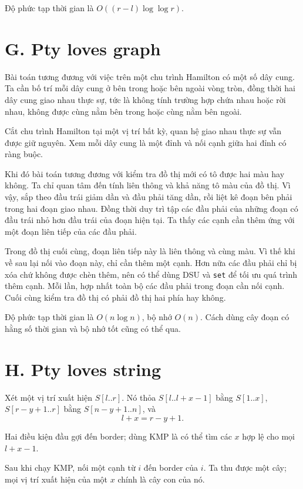 \documentclass[11pt]{article}
\begin{document}
Độ phức tạp thời gian là $O((r-l)\log\log r)$.

\section{G. Pty loves graph}

Bài toán tương đương với việc trên một chu trình Hamilton có một số dây
cung. Ta cần bố trí mỗi dây cung ở bên trong hoặc bên ngoài vòng tròn, đồng
thời hai dây cung giao nhau thực sự, tức là không tính trường hợp chứa nhau
hoặc rời nhau, không được cùng nằm bên trong hoặc cùng nằm bên ngoài.

Cắt chu trình Hamilton tại một vị trí bất kỳ, quan hệ giao nhau thực sự vẫn
được giữ nguyên. Xem mỗi dây cung là một đỉnh và nối cạnh giữa hai đỉnh có
ràng buộc.

Khi đó bài toán tương đương với kiểm tra đồ thị mới có tô được hai màu hay
không. Ta chỉ quan tâm đến tính liên thông và khả năng tô màu của đồ thị.
Vì vậy, sắp theo đầu trái giảm dần và đầu phải tăng dần, rồi liệt kê đoạn
bên phải trong hai đoạn giao nhau. Đồng thời duy trì tập các đầu phải của
những đoạn có đầu trái nhỏ hơn đầu trái của đoạn hiện tại. Ta thấy các cạnh
cần thêm ứng với một đoạn liên tiếp của các đầu phải.

Trong đồ thị cuối cùng, đoạn liên tiếp này là liên thông và cùng màu. Vì thế
khi về sau lại nối vào đoạn này, chỉ cần thêm một cạnh. Hơn nữa các đầu phải
chỉ bị xóa chứ không được chèn thêm, nên có thể dùng DSU và \texttt{set} để
tối ưu quá trình thêm cạnh. Mỗi lần, hợp nhất toàn bộ các đầu phải trong
đoạn cần nối cạnh. Cuối cùng kiểm tra đồ thị có phải đồ thị hai phía hay
không.

Độ phức tạp thời gian là $O(n\log n)$, bộ nhớ $O(n)$. Cách dùng cây đoạn có
hằng số thời gian và bộ nhớ tốt cũng có thể qua.

\section{H. Pty loves string}

Xét một vị trí xuất hiện $S[l..r]$. Nó thỏa
$S[l..l+x-1]$ bằng $S[1..x]$, $S[r-y+1..r]$ bằng $S[n-y+1..n]$, và
\[
  l+x=r-y+1.
\]

Hai điều kiện đầu gợi đến border; dùng KMP là có thể tìm các $x$ hợp lệ cho
mọi $l+x-1$.

Sau khi chạy KMP, nối một cạnh từ $i$ đến border của $i$. Ta thu được một
cây; mọi vị trí xuất hiện của một $x$ chính là cây con của nó.
\end{document}

